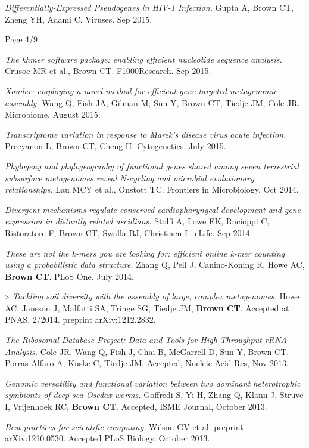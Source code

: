 \documentclass[margin,line]{resume}
\begin{document}
\begin{resume}
{\em Differentially-Expressed Pseudogenes in HIV-1 Infection.} Gupta A, Brown CT, Zheng YH, Adami C. Viruses. Sep 2015.

\vspace{1cm}
{\centerline {Page 4/9}}

\newpage

{\em The khmer software package: enabling efficient nucleotide sequence analysis.} Crusoe MR et al., Brown CT. F1000Research. Sep 2015.

{\em Xander: employing a novel method for efficient gene-targeted metagenomic assembly.} Wang Q, Fish JA, Gilman M, Sun Y, Brown CT, Tiedje JM, Cole JR. Microbiome. August 2015.

{\em Transcriptome variation in response to Marek’s disease virus acute infection.} Preeyanon L, Brown CT, Cheng H. Cytogenetics. July 2015.

{\em Phylogeny and phylogeography of functional genes shared among seven terrestrial subsurface metagenomes reveal N-cycling and microbial evolutionary relationships.} Lau MCY et al., Onstott TC. Frontiers in Microbiology. Oct 2014.

{\em Divergent mechanisms regulate conserved cardiopharyngeal development and gene expression in distantly related ascidians.} Stolfi A, Lowe EK, Racioppi C, Ristoratore F, Brown CT, Swalla BJ, Christiaen L. eLife. Sep 2014.

{\em These are not the k-mers you are looking for: efficient online
  k-mer counting using a probabilistic data structure.} Zhang Q, Pell
J, Canino-Koning R, Howe AC, {\bf Brown CT}.  PLoS One. July 2014.

{\color{red} ${\bf \triangleright}$}
{\em Tackling soil diversity with the assembly of large, complex metagenomes.}
Howe AC, Jansson J, Malfatti SA, Tringe SG, Tiedje JM, {\bf Brown CT}. Accepted at PNAS, 2/2014.  preprint arXiv:1212.2832.

{\em The Ribosomal Database Project: Data and Tools for High Throughput rRNA Analysis.} Cole JR, Wang Q, Fish J, Chai B, McGarrell D, Sun Y, Brown CT, Porras-Alfaro A, Kuske C, Tiedje JM.  Accepted, Nucleic Acid Res, Nov 2013.

{\em Genomic versatility and functional variation between two dominant
heterotrophic symbionts of deep-sea {\rm Osedax} worms.} Goffredi S, Yi H, Zhang Q, Klann J, Struve I, Vrijenhoek RC, {\bf Brown CT}. Accepted, ISME Journal, October 2013.

{\em Best practices for scientific computing.} Wilson GV et al. preprint arXiv:1210.0530. Accepted PLoS Biology, October 2013.


\end{resume}
\end{document}

